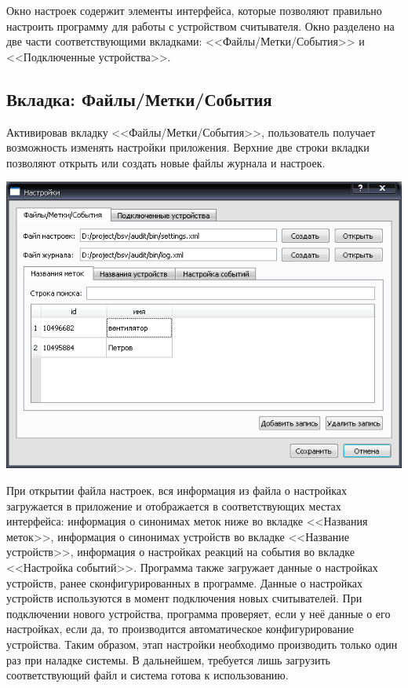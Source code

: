 ﻿Окно настроек содержит элементы интерфейса, которые позволяют правильно настроить программу для
работы с устройством считывателя. Окно разделено на две части соответствующими вкладками: <<Файлы/Метки/События>> и
<<Подключенные устройства>>.

\subsection{Вкладка: Файлы/Метки/События}

Активировав вкладку
<<Файлы/Метки/События>>, пользователь получает возможность изменять настройки приложения. Верхние две строки вкладки
позволяют открыть или создать новые файлы журнала и настроек. 

\begin{center}
    \includegraphics[scale=0.5]{img/settings_tag.png}
\end{center}

При открытии файла настроек, вся информация
из файла о настройках загружается в приложение и отображается в соответствующих местах интерфейса: информация о синонимах меток
ниже во вкладке <<Названия меток>>, информация о синонимах устройств во вкладке <<Название устройств>>, информация о 
настройках реакций на события во вкладке <<Настройка событий>>. Программа также загружает данные о 
настройках устройств, ранее сконфигурированных в программе.
Данные о настройках устройств используются в момент подключения новых считывателей. При подключении
нового устройства, программа проверяет, если у неё данные о его настройках, если да, то производится
автоматическое конфигурирование устройства. Таким образом, этап настройки необходимо производить только один раз
при наладке системы. В дальнейшем, требуется лишь загрузить соответствующий файл и система готова к использованию.

